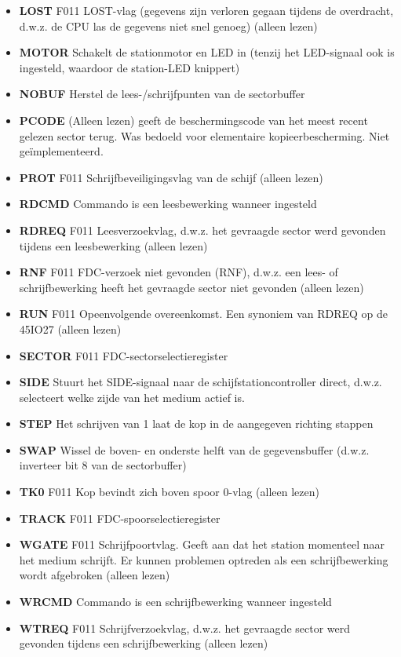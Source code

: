 \begin{itemize}
\item{\bf{LOST}} F011 LOST-vlag (gegevens zijn verloren gegaan tijdens de overdracht, d.w.z. de CPU las de gegevens niet snel genoeg) (alleen lezen)
\item{\bf{MOTOR}} Schakelt de stationmotor en LED in (tenzij het LED-signaal ook is ingesteld, waardoor de station-LED knippert)
\item{\bf{NOBUF}} Herstel de lees-/schrijfpunten van de sectorbuffer
\item{\bf{PCODE}} (Alleen lezen) geeft de beschermingscode van het meest recent gelezen sector terug. Was bedoeld voor elementaire kopieerbescherming. Niet geïmplementeerd.
\item{\bf{PROT}} F011 Schrijfbeveiligingsvlag van de schijf (alleen lezen)
\item{\bf{RDCMD}} Commando is een leesbewerking wanneer ingesteld
\item{\bf{RDREQ}} F011 Leesverzoekvlag, d.w.z. het gevraagde sector werd gevonden tijdens een leesbewerking (alleen lezen)
\item{\bf{RNF}} F011 FDC-verzoek niet gevonden (RNF), d.w.z. een lees- of schrijfbewerking heeft het gevraagde sector niet gevonden (alleen lezen)
\item{\bf{RUN}} F011 Opeenvolgende overeenkomst. Een synoniem van RDREQ op de 45IO27 (alleen lezen)
\item{\bf{SECTOR}} F011 FDC-sectorselectieregister
\item{\bf{SIDE}} Stuurt het SIDE-signaal naar de schijfstationcontroller direct, d.w.z. selecteert welke zijde van het medium actief is.
\item{\bf{STEP}} Het schrijven van 1 laat de kop in de aangegeven richting stappen
\item{\bf{SWAP}} Wissel de boven- en onderste helft van de gegevensbuffer (d.w.z. inverteer bit 8 van de sectorbuffer)
\item{\bf{TK0}} F011 Kop bevindt zich boven spoor 0-vlag (alleen lezen)
\item{\bf{TRACK}} F011 FDC-spoorselectieregister
\item{\bf{WGATE}} F011 Schrijfpoortvlag. Geeft aan dat het station momenteel naar het medium schrijft. Er kunnen problemen optreden als een schrijfbewerking wordt afgebroken (alleen lezen)
\item{\bf{WRCMD}} Commando is een schrijfbewerking wanneer ingesteld
\item{\bf{WTREQ}} F011 Schrijfverzoekvlag, d.w.z. het gevraagde sector werd gevonden tijdens een schrijfbewerking (alleen lezen)
\end{itemize}

